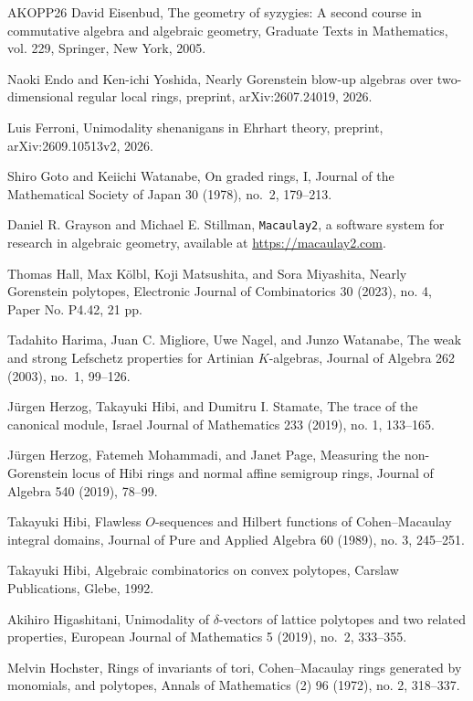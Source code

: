 \documentclass[a4paper,11pt]{amsart}
\theoremstyle{definition}
\begin{document}
\begin{thebibliography}{AKOPP26}
 David Eisenbud, The geometry of syzygies: A second course in commutative algebra and algebraic geometry, Graduate Texts in Mathematics, vol. 229, Springer, New York, 2005.

 Naoki Endo and Ken-ichi Yoshida, Nearly Gorenstein blow-up algebras over two-dimensional regular local rings, preprint, arXiv:2607.24019, 2026.

 Luis Ferroni, Unimodality shenanigans in Ehrhart theory, preprint, arXiv:2609.10513v2, 2026.

 Shiro Goto and Keiichi Watanabe, On graded rings, I, Journal of the Mathematical Society of Japan 30 (1978), no.~2, 179--213.

 Daniel R. Grayson and Michael E. Stillman, \texttt{Macaulay2}, a software system for research in algebraic geometry, available at \url{https://macaulay2.com}.

 Thomas Hall, Max K\"olbl, Koji Matsushita, and Sora Miyashita, Nearly Gorenstein polytopes, Electronic Journal of Combinatorics 30 (2023), no. 4, Paper No. P4.42, 21 pp.

 Tadahito Harima, Juan C. Migliore, Uwe Nagel, and Junzo Watanabe, The weak and strong Lefschetz properties for Artinian $K$-algebras, Journal of Algebra 262 (2003), no.~1, 99--126.

 J\"urgen Herzog, Takayuki Hibi, and Dumitru I. Stamate, The trace of the canonical module, Israel Journal of Mathematics 233 (2019), no. 1, 133--165.

 J\"urgen Herzog, Fatemeh Mohammadi, and Janet Page, Measuring the non-Gorenstein locus of Hibi rings and normal affine semigroup rings, Journal of Algebra 540 (2019), 78--99.

 Takayuki Hibi, Flawless $O$-sequences and Hilbert functions of Cohen--Macaulay integral domains, Journal of Pure and Applied Algebra 60 (1989), no. 3, 245--251.

 Takayuki Hibi, Algebraic combinatorics on convex polytopes, Carslaw Publications, Glebe, 1992.

 Akihiro Higashitani, Unimodality of $\delta$-vectors of lattice polytopes and two related properties, European Journal of Mathematics 5 (2019), no.~2, 333--355.

 Melvin Hochster, Rings of invariants of tori, Cohen--Macaulay rings generated by monomials, and polytopes, Annals of Mathematics (2) 96 (1972), no. 2, 318--337.


\end{thebibliography}
\end{document}
